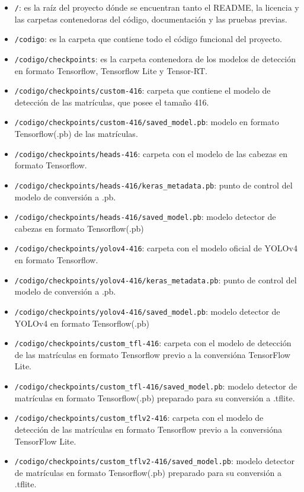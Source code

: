 \begin{itemize}
    \tightlist
    \item \texttt{/}: es la raíz del proyecto dónde se encuentran tanto el README, la licencia y las carpetas contenedoras del código, documentación y las pruebas previas.
    \item \texttt{/codigo}: es la carpeta que contiene todo el código funcional del proyecto.
    \item \texttt{/codigo/checkpoints}: es la carpeta contenedora de los modelos de detección en formato Tensorflow, Tensorflow Lite y Tensor-RT.
    \item \texttt{/codigo/checkpoints/custom-416}: carpeta que contiene el modelo de detección de las matrículas, que posee el tamaño 416.
    \item \texttt{/codigo/checkpoints/custom-416/saved\_model.pb}: modelo en formato Tensorflow(.pb) de las matrículas.
    \item \texttt{/codigo/checkpoints/heads-416}: carpeta con el modelo de las cabezas en formato Tensorflow.
    \item \texttt{/codigo/checkpoints/heads-416/keras\_metadata.pb}: punto de control del modelo de conversión a .pb.
    \item \texttt{/codigo/checkpoints/heads-416/saved\_model.pb}: modelo detector de cabezas en formato Tensorflow(.pb)
    \item \texttt{/codigo/checkpoints/yolov4-416}: carpeta con el modelo oficial de YOLOv4 en formato Tensorflow.
    \item \texttt{/codigo/checkpoints/yolov4-416/keras\_metadata.pb}: punto de control del modelo de conversión a .pb.
    \item \texttt{/codigo/checkpoints/yolov4-416/saved\_model.pb}: modelo detector de YOLOv4 en formato Tensorflow(.pb)
    \item \texttt{/codigo/checkpoints/custom\_tfl-416}: carpeta con el modelo de detección de las matrículas en formato Tensorflow previo a la conversióna TensorFlow Lite.
    \item \texttt{/codigo/checkpoints/custom\_tfl-416/saved\_model.pb}: modelo detector de matrículas en formato Tensorflow(.pb) preparado para su conversión a .tflite.
    \item \texttt{/codigo/checkpoints/custom\_tflv2-416}: carpeta con el modelo de detección de las matrículas en formato Tensorflow previo a la conversióna TensorFlow Lite.
    \item \texttt{/codigo/checkpoints/custom\_tflv2-416/saved\_model.pb}: modelo detector de matrículas en formato Tensorflow(.pb) preparado para su conversión a .tflite.

\end{itemize}
